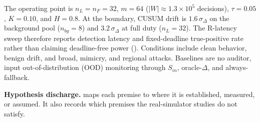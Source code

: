\documentclass{article}
\newcommand{\sigd}{\sigma_{\Delta}}
\begin{document}
The operating point is $n_L{=}n_F{=}32$, $m{=}64$
($|W|\approx1.3{\times}10^5$ decisions), $\tau{=}0.05$, $K{=}0.10$, and
$H{=}0.8$. At the boundary, CUSUM drift is $1.6\,\sigd$ on the background pool
($n_{bg}{=}8$) and $3.2\,\sigd$ at full duty ($n_L{=}32$). The R-latency sweep
therefore reports detection latency and fixed-deadline true-positive rate rather
than claiming deadline-free power (). Conditions include clean
behavior, benign drift, and broad, mimicry, and regional attacks. Baselines are
no auditor, input out-of-distribution (OOD) monitoring through $S_{in}$,
oracle-$\Delta$, and always-fallback.

\textbf{Hypothesis discharge.}  maps each premise to where it
is established, measured, or assumed. It also records which premises the
real-simulator studies do not satisfy.
\end{document}
